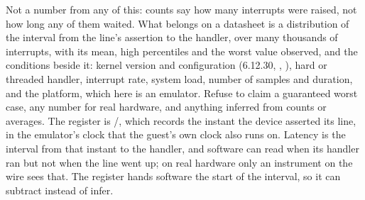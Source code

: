  Not a number from any of this: counts say how many interrupts were raised, not how long
any of them waited. What belongs on a datasheet is a distribution of the interval from the line's
assertion to the handler, over many thousands of interrupts, with its mean, high percentiles and
the worst value observed, and the conditions beside it: kernel version and configuration
(6.12.30, , ), hard or threaded handler, interrupt rate, system load,
number of samples and duration, and the platform, which here is an emulator. Refuse to claim a
guaranteed worst case, any number for real hardware, and anything inferred from counts or averages.
The register is /, which records the instant the device asserted
its line, in the emulator's clock that the guest's own clock also runs on. Latency is the interval
from that instant to the handler, and software can read when its handler ran but not when the line
went up; on real hardware only an instrument on the wire sees that. The register hands software the
start of the interval, so it can subtract instead of infer.
